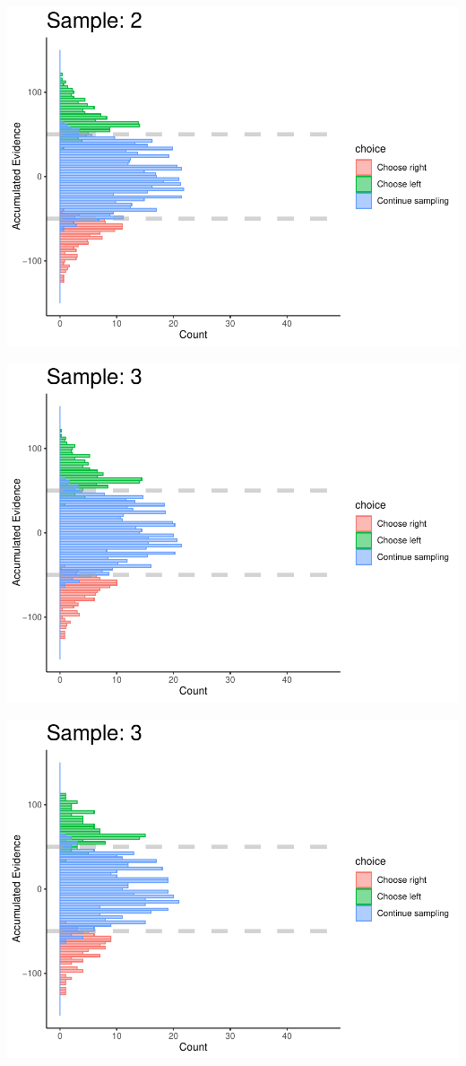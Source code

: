 \documentclass[
]{book}
\begin{document}
\begin{center}\includegraphics[width=0.8\linewidth]{LateNightBayes_files/figure-latex/fixed_check-19} \end{center}

\begin{center}\includegraphics[width=0.8\linewidth]{LateNightBayes_files/figure-latex/fixed_check-20} \end{center}

\begin{center}\includegraphics[width=0.8\linewidth]{LateNightBayes_files/figure-latex/fixed_check-21} \end{center}
\end{document}

